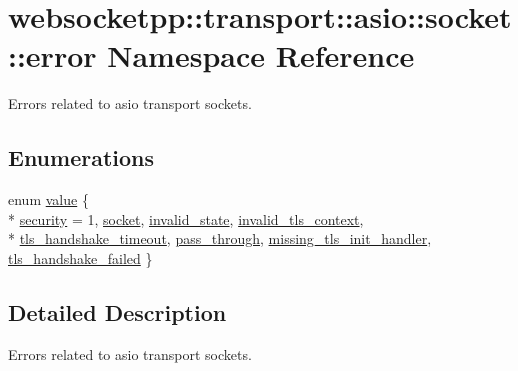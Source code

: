 \hypertarget{namespacewebsocketpp_1_1transport_1_1asio_1_1socket_1_1error}{}\section{websocketpp\+:\+:transport\+:\+:asio\+:\+:socket\+:\+:error Namespace Reference}
\label{namespacewebsocketpp_1_1transport_1_1asio_1_1socket_1_1error}


Errors related to asio transport sockets.  


\subsection*{Enumerations}
\begin{DoxyCompactItemize}
\item 
enum \hyperlink{namespacewebsocketpp_1_1transport_1_1asio_1_1socket_1_1error_a828ddaa5ed63a761e1b557465a35f05a}{value} \{ \\*
\hyperlink{namespacewebsocketpp_1_1transport_1_1asio_1_1socket_1_1error_a828ddaa5ed63a761e1b557465a35f05aacaab9f83cf829c57e4d1c76eafff7540}{security} = 1, 
\hyperlink{namespacewebsocketpp_1_1transport_1_1asio_1_1socket_1_1error_a828ddaa5ed63a761e1b557465a35f05aa0c31b356014843e1d09514e794a539a7}{socket}, 
\hyperlink{namespacewebsocketpp_1_1transport_1_1asio_1_1socket_1_1error_a828ddaa5ed63a761e1b557465a35f05aa380b076a3c91fb5336539d7f4d395777}{invalid\+\_\+state}, 
\hyperlink{namespacewebsocketpp_1_1transport_1_1asio_1_1socket_1_1error_a828ddaa5ed63a761e1b557465a35f05aa2ad7fa2055918823bdedb031839de9de}{invalid\+\_\+tls\+\_\+context}, 
\\*
\hyperlink{namespacewebsocketpp_1_1transport_1_1asio_1_1socket_1_1error_a828ddaa5ed63a761e1b557465a35f05aa6ae4c96e0d2a177bb3c8eab1c45ccda0}{tls\+\_\+handshake\+\_\+timeout}, 
\hyperlink{namespacewebsocketpp_1_1transport_1_1asio_1_1socket_1_1error_a828ddaa5ed63a761e1b557465a35f05aaa4b14e51bb97d6ab9654ee7219ffca30}{pass\+\_\+through}, 
\hyperlink{namespacewebsocketpp_1_1transport_1_1asio_1_1socket_1_1error_a828ddaa5ed63a761e1b557465a35f05aa295e5ba0b108125ce445aa2ce1ec45cd}{missing\+\_\+tls\+\_\+init\+\_\+handler}, 
\hyperlink{namespacewebsocketpp_1_1transport_1_1asio_1_1socket_1_1error_a828ddaa5ed63a761e1b557465a35f05aa61f1919da9afed818c8533b0dcf9d2db}{tls\+\_\+handshake\+\_\+failed}
 \}
\end{DoxyCompactItemize}


\subsection{Detailed Description}
Errors related to asio transport sockets. 

